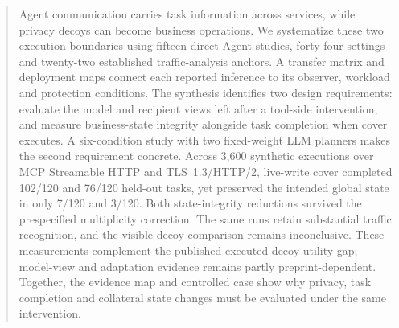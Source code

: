 \begin{abstract}
Agent communication carries task information across services, while privacy decoys can become business operations. We systematize these two execution boundaries using fifteen direct Agent studies, forty-four settings and twenty-two established traffic-analysis anchors. A transfer matrix and deployment maps connect each reported inference to its observer, workload and protection conditions. The synthesis identifies two design requirements: evaluate the model and recipient views left after a tool-side intervention, and measure business-state integrity alongside task completion when cover executes. A six-condition study with two fixed-weight LLM planners makes the second requirement concrete. Across 3,600 synthetic executions over MCP Streamable HTTP and TLS~1.3/HTTP/2, live-write cover completed 102/120 and 76/120 held-out tasks, yet preserved the intended global state in only 7/120 and 3/120. Both state-integrity reductions survived the prespecified multiplicity correction. The same runs retain substantial traffic recognition, and the visible-decoy comparison remains inconclusive. These measurements complement the published executed-decoy utility gap; model-view and adaptation evidence remains partly preprint-dependent. Together, the evidence map and controlled case show why privacy, task completion and collateral state changes must be evaluated under the same intervention.
\end{abstract}
